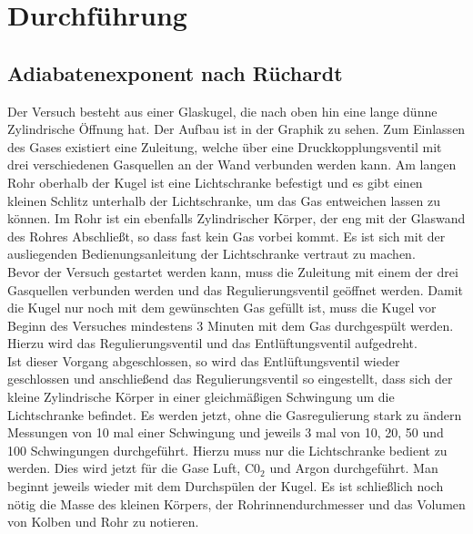 \documentclass[12pt,a4paper,titlepage,headinclude,bibtotoc]{scrartcl}
\begin{document}
\section{Durchführung}
\label{sec:durchfuehrung}

\subsection{Adiabatenexponent nach Rüchardt}
Der Versuch besteht aus einer Glaskugel, die nach oben hin eine lange dünne Zylindrische Öffnung hat.
Der Aufbau ist in der Graphik %
zu sehen.
Zum Einlassen des Gases existiert eine Zuleitung, welche über eine Druckkopplungsventil mit drei verschiedenen Gasquellen an der Wand verbunden werden kann.
Am langen Rohr oberhalb der Kugel ist eine Lichtschranke befestigt und es gibt einen kleinen Schlitz unterhalb der Lichtschranke, um das Gas entweichen lassen zu können.
Im Rohr ist ein ebenfalls Zylindrischer Körper, der eng mit der Glaswand des Rohres Abschließt, so dass fast kein Gas vorbei kommt.
Es ist sich mit der ausliegenden Bedienungsanleitung der Lichtschranke vertraut zu machen.\\
Bevor der Versuch gestartet werden kann, muss die Zuleitung mit einem der drei Gasquellen verbunden werden und das Regulierungsventil geöffnet werden.
Damit die Kugel nur noch mit dem gewünschten Gas gefüllt ist, muss die Kugel vor Beginn des Versuches mindestens 3 Minuten mit dem Gas durchgespült werden.
Hierzu wird das Regulierungsventil und das Entlüftungsventil aufgedreht.\\
Ist dieser Vorgang abgeschlossen, so wird das Entlüftungsventil wieder geschlossen und anschließend das Regulierungsventil so eingestellt, dass sich der kleine Zylindrische Körper in einer gleichmäßigen Schwingung um die Lichtschranke befindet.
Es werden jetzt, ohne die Gasregulierung stark zu ändern Messungen von 10 mal einer Schwingung und jeweils 3 mal von 10, 20, 50 und 100 Schwingungen durchgeführt.
Hierzu muss nur die Lichtschranke bedient zu werden.
Dies wird jetzt für die Gase Luft, C0$_2$ und Argon durchgeführt.
Man beginnt jeweils wieder mit dem Durchspülen der Kugel.
Es ist schließlich noch nötig die Masse des kleinen Körpers, der Rohrinnendurchmesser und das Volumen von Kolben und Rohr zu notieren.
\end{document}
